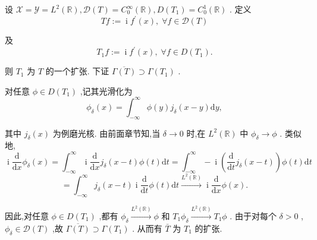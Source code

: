 \documentclass[lang=cn,newtx,10pt,scheme=chinese,thmcnt=chapter]{elegantbook}
\newcommand{\dif}{\mathrm{d}}
\newcommand{\ci}{\operatorname{i}}
\begin{document}
\begin{example}
     设 \(\mathcal{X} = \mathcal{Y} = {L}^{2}\left( \mathbb{R}\right) ,\mathcal{D}(T)  = {C}_{0}^{\infty }\left( \mathbb{R}\right) ,D\left( {T}_{1}\right)  = {C}_{0}^{1}\left( \mathbb{R}\right)\) . 定义
\begin{equation*}
{Tf} \mathrel{\text{ := }} \ci{f}^{\prime }\left( x\right) ,\;\forall f \in  \mathcal{D}(T)
\end{equation*}

及
\begin{equation*}
{T}_{1}f \mathrel{\text{ := }} \ci{f}^{\prime }\left( x\right) ,\;\forall f \in  D\left( {T}_{1}\right) .
\end{equation*}

则 \({T}_{1}\) 为 \(T\) 的一个扩张. 下证 \(\overline{\Gamma \left( T\right) } \supset  \Gamma \left( {T}_{1}\right)\) .

对任意 \(\phi  \in  D\left( {T}_{1}\right)\) ,记其光滑化为
\begin{equation*}
{\phi }_{\delta }\left( x\right)  = {\int }_{-\infty }^{\infty }\phi \left( y\right) {j}_{\delta }\left( {x - y}\right) {\dif y},
\end{equation*}

其中 \({j}_{\delta }\left( x\right)\) 为例磨光核. 由前面章节知,当 \(\delta  \rightarrow  0\) 时,在 \({L}^{2}\left( \mathbb{R}\right)\) 中 \({\phi }_{\delta } \rightarrow  \phi\) . 类似地,
\begin{equation*}
\ci\frac{\dif}{\dif x}{\phi }_{\delta }\left( x\right)  = {\int }_{-\infty }^{\infty }\ci\frac{\dif}{\dif x}{j}_{\delta }\left( {x - t}\right) \phi \left( t\right) {\dif t}
= {\int }_{-\infty }^{\infty } - \ci\left( {\frac{\dif }{\dif t}{j}_{\delta }\left( {x - t}\right) }\right) \phi \left( t\right) {\dif t}
\end{equation*}
\begin{equation*}
= {\int }_{-\infty }^{\infty }{j}_{\delta }\left( {x - t}\right) \ci\frac{\dif }{\dif t}\phi \left( t\right) {\dif t}
\overset{{L}^{2}\left( \mathbb{R}\right) }{ \rightarrow  }\ci\frac{\dif }{\dif x}\phi \left( x\right) .
\end{equation*}

因此,对任意 \(\phi  \in  D\left( {T}_{1}\right)\) ,都有 \({\phi }_{\delta }\overset{{L}^{2}\left( \mathbb{R}\right) }{ \rightarrow  }\phi\) 和 \({T}_{1}{\phi }_{\delta }\overset{{L}^{2}\left( \mathbb{R}\right) }{ \rightarrow  }{T}_{1}\phi\) . 由于对每个 \(\delta  > 0\) , \({\phi }_{\delta } \in  \mathcal{D}(T)\) ,故 \(\overline{\Gamma \left( T\right) } \supset  \Gamma \left( {T}_{1}\right)\) . 从而有 \(\bar{T}\) 为 \({T}_{1}\) 的扩张.

\end{example}
\end{document}
